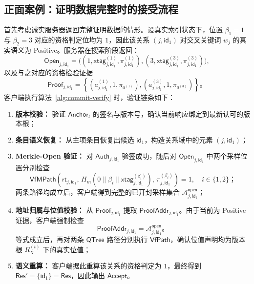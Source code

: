 \subsection{正面案例：证明数据完整时的接受流程}
首先考虑诚实服务器返回完整证明数据的情形。设真实索引状态下，位置 $\beta_1=1$ 与 $\beta_2=3$ 对应的资格判定位均为 $1$，因此该关系 $(j,\mathsf{id}_1)$ 对交叉关键词 $w_j$ 的真实语义为 Positive。服务器在搜索阶段返回：
\begin{equation}
\mathsf{Open}_{j,\mathsf{id}_1}=
\bigl(
(1,\mathsf{xtag}_{j,\mathsf{id}_1}^{(1)},\pi_{j,\mathsf{id}_1}^{(1)}),
(3,\mathsf{xtag}_{j,\mathsf{id}_1}^{(3)},\pi_{j,\mathsf{id}_1}^{(3)})
\bigr),
\end{equation}
以及与之对应的资格检验证据
\begin{equation}
\mathsf{Proof}_{j,\mathsf{id}_1}=
\left\{
\left(a_{j,\mathsf{id}_1}^{(1)},1,\pi_{a^{(1)}}\right),
\left(a_{j,\mathsf{id}_1}^{(3)},1,\pi_{a^{(3)}}\right)
\right\}\text{。}
\end{equation}
客户端执行算法~\ref{alg:commit-verify} 时，验证链条如下：
\begin{enumerate}
\item \textbf{版本校验：} 验证 $\mathsf{Anchor}_t$ 的签名与版本号，确认当前响应绑定到最新认可的版本根；
\item \textbf{条目语义恢复：} 从主项条目恢复出候选 $\mathsf{id}_1$，构造关系域中的元素 $(j,\mathsf{id}_1)$；
\item \textbf{Merkle-Open 验证：} 对 $\mathsf{Auth}_{j,\mathsf{id}_1}$ 验签成功，随后对 $\mathsf{Open}_{j,\mathsf{id}_1}$ 中两个采样位置分别检查
\begin{equation}
\mathsf{VfMPath}\!\left(\mathsf{rt}_{j,\mathsf{id}_1},\,H_m(0\|\beta_i\|\mathsf{xtag}_{j,\mathsf{id}_1}^{(\beta_i)}),\,\pi_{j,\mathsf{id}_1}^{(\beta_i)}\right)=1,\quad i\in\{1,2\}\text{；}
\end{equation}
两条路径均成立后，客户端得到完整的已开封采样集合 $\mathcal{A}_{j,\mathsf{id}_1}^{\mathsf{open}}$；
\item \textbf{地址归属与位值校验：} 从 $\mathsf{Proof}_{j,\mathsf{id}_1}$ 提取 $\mathsf{ProofAddr}_{j,\mathsf{id}_1}$。由于当前为 Positive 证据，客户端强制检查
\begin{equation}
\mathsf{ProofAddr}_{j,\mathsf{id}_1}=\mathcal{A}_{j,\mathsf{id}_1}^{\mathsf{open}}\text{。}
\end{equation}
等式成立后，再对两条 $\mathsf{QTree}$ 路径分别执行 $\mathsf{VfPath}$，确认位值声明均为版本根 $R_X^{(t)}$ 下的真实位值；
\item \textbf{语义重算：} 客户端据此重算该关系的资格判定为 $1$，最终得到 $\mathsf{Res}'=\{\mathsf{id}_1\}=\mathsf{Res}$，因此输出 $\mathsf{Accept}$。
\end{enumerate}

